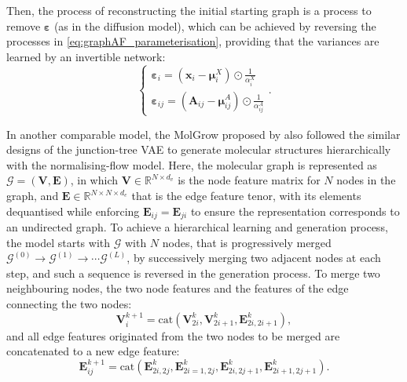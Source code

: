 Then, the process of reconstructing the initial starting graph is a process to remove $\boldsymbol{\varepsilon}$ (as in the diffusion model), which can be achieved by reversing the processes in \cref{eq:graphAF_parameterisation}, providing that the variances are learned by an invertible network:
\begin{equation*}
    \begin{cases}
        \boldsymbol{\varepsilon}_i=\left(\bm{x}_i-\boldsymbol{\mu}_i^X\right)\odot\frac{1}{\alpha_i^X}\\
        \boldsymbol{\varepsilon}_{ij}=\left(\bm{A}_{ij}-\boldsymbol{\mu}_{ij}^A\right)\odot\frac{1}{\alpha_{ij}^A}
    \end{cases}.
\end{equation*}

In another comparable model, the MolGrow proposed by \citet{kuznetsov2021molgrow} also followed the similar designs of the junction-tree VAE\cite{jin2018junction} to generate molecular structures hierarchically with the normalising-flow model. Here, the molecular graph is represented as $\mathcal{G}=(\bm{V},\bm{E})$, in which $\bm{V}\in\mathbb{R}^{N\times d_v}$ is the node feature matrix for $N$ nodes in the graph, and $\bm{E}\in\mathbb{R}^{N\times N\times d_e}$ that is the edge feature tenor, with its elements dequantised while enforcing $\bm{E}_{ij}=\bm{E}_{ji}$ to ensure the representation corresponds to an undirected graph. To achieve a hierarchical learning and generation process, the model starts with $\mathcal{G}$ with $N$ nodes, that is progressively merged $\mathcal{G}^{(0)}\to\mathcal{G}^{(1)}\to\cdots\mathcal{G}^{(L)}$, by successively merging two adjacent nodes at each step, and such a sequence is reversed in the generation process. To merge two neighbouring nodes,  the two node features and the features of the edge connecting the two nodes:
\begin{equation*}    \bm{V}_{i}^{k+1}=\mbox{cat}\left(\bm{V}_{2i}^k,\bm{V}_{2i+1}^k,\bm{E}_{2i,2i+1}^k \right),
\end{equation*}
and all edge features originated from the two nodes to be merged are concatenated to  a new edge feature:
\begin{equation*}
\bm{E}_{ij}^{k+1}=\mbox{cat}\left(\bm{E}_{2i,2j}^k,\bm{E}_{2i=1,2j}^k,\bm{E}_{2i,2j+1}^k,\bm{E}_{2i+1,2j+1}^k \right).
\end{equation*}
